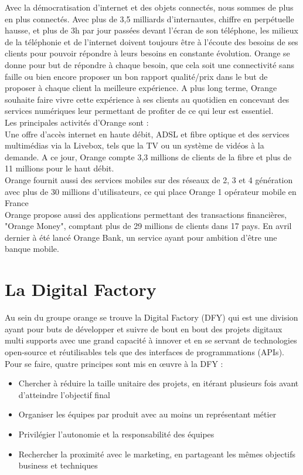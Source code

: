 Avec la démocratisation d'internet et des objets connectés, nous sommes de plus en plus connectés. Avec plus de 3,5 milliards d'internautes, chiffre en perpétuelle hausse, et plus de 3h par jour passées devant l'écran de son téléphone, les milieux de la téléphonie et de l'internet doivent toujours être à l'écoute des besoins de ses clients pour pouvoir répondre à leurs besoins en constante évolution. Orange se donne pour but de répondre à chaque besoin, que cela soit une connectivité sans faille ou bien encore proposer un bon rapport qualité/prix dans le but de proposer à chaque client la meilleure expérience. A plus long terme, Orange souhaite faire vivre cette expérience à ses clients au quotidien en concevant des services numériques leur permettant de profiter de ce qui leur est essentiel. \\
Les principales activités d'Orange sont :\\
Une offre d'accès internet en haute débit, ADSL et fibre optique et des services multimédias via la Livebox, tels que la TV ou un système de vidéos à la demande. A ce jour, Orange compte 3,3 millions de clients de la fibre et plus de 11 millions pour le haut débit.\\
Orange fournit aussi des services mobiles sur des réseaux de 2, 3 et 4 génération avec plus de 30 millions d'utilisateurs, ce qui place Orange 1 opérateur mobile en France\\
Orange propose aussi des applications permettant des transactions financières, "Orange Money", comptant plus de 29 millions de clients dans 17 pays. En avril dernier à été lancé Orange Bank, un service ayant pour ambition d'être une banque mobile.


\section{La Digital Factory}

Au sein du groupe orange se trouve la Digital Factory (DFY) qui est une division ayant pour buts de développer et suivre de bout en bout des projets digitaux multi supports avec une grand capacité à innover et en se servant de technologies open-source et réutilisables tels que des interfaces de programmations (APIs). Pour se faire, quatre principes sont mis en \oe{}uvre à la DFY :

\begin{itemize}
    \item Chercher à réduire la taille unitaire des projets, en itérant plusieurs fois avant 	d’atteindre l’objectif final
    \item Organiser les équipes par produit avec au moins un représentant métier
    \item Privilégier l’autonomie et la responsabilité des équipes
    \item Rechercher la proximité avec le marketing, en partageant les mêmes objectifs business et techniques
\end{itemize}

